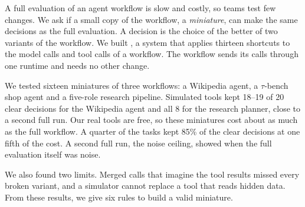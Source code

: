 A full evaluation of an agent workflow is slow and costly, so teams test few changes. We ask if a
small copy of the workflow, a \emph{miniature}, can make the same decisions as the full
evaluation. A decision is the choice of the better of two variants of the workflow. We built
\sys{}\codefootnote, a system that applies thirteen shortcuts to the model calls and tool calls of a
workflow. The workflow sends its calls through one runtime and needs no other change.

We tested sixteen miniatures of three workflows: a Wikipedia agent, a $\tau$-bench shop agent and
a five-role research pipeline. Simulated tools kept 18--19 of 20 clear decisions for the Wikipedia
agent and all 8 for the research planner, close to a second full run. Our real tools are free, so
these miniatures cost about as much as the full workflow. A quarter of the tasks kept 85\% of the
clear decisions at one fifth of the cost. A second full run, the noise ceiling, showed when the full
evaluation itself was noise.

We also found two limits. Merged calls that imagine the tool results missed every broken variant,
and a simulator cannot replace a tool that reads hidden data. From these results, we give six rules
to build a valid miniature.
